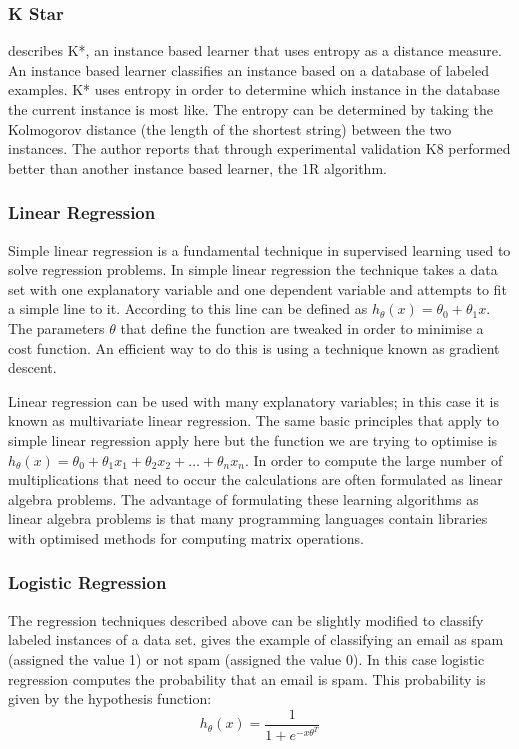 \subsubsection{K Star}

\cite{cleary1995k} describes K*, an instance based learner that uses entropy as a distance measure. An instance based learner classifies an instance based on a database of labeled examples. K* uses entropy in order to determine which instance in the database the current instance is most like. The entropy can be determined by taking the Kolmogorov distance (the length of the shortest string) between the two instances. The author reports that through experimental validation K8 performed better than another instance based learner, the 1R algorithm.

\subsubsection{Linear Regression}

Simple linear regression is a fundamental technique in supervised learning used to solve regression problems. In simple linear regression the technique takes a data set with one explanatory variable and one dependent variable and attempts to fit a simple line to it. According to \cite{ng2000cs229} this line can be defined as $h_{\theta}(x) = \theta_0 + \theta_1 x$. The parameters $\theta$ that define the function are tweaked in order to minimise a cost function. An efficient way to do this is using a technique known as gradient descent.

Linear regression can be used with many explanatory variables; in this case it is known as multivariate linear regression. The same basic principles that apply to simple linear regression apply here but the function we are trying to optimise is  $h_{\theta}(x) = \theta_0 + \theta_1 x_1 + \theta_2 x_2 + \ldots + \theta_n x_n$. In order to compute the large number of multiplications that need to occur the calculations are often formulated as linear algebra problems. The advantage of formulating these learning algorithms as linear algebra problems is that many programming languages contain libraries with optimised methods for computing matrix operations.

\subsubsection{Logistic Regression}

The regression techniques described above can be slightly modified to classify labeled instances of a data set. \cite{ng2000cs229} gives the example of classifying an email as spam (assigned the value 1) or not spam (assigned the value 0). In this case logistic regression computes the probability that an email is spam. This probability is given by the hypothesis function:
$$h_\theta(x) = \frac{1}{1 + e^{-x\theta^T}}$$

